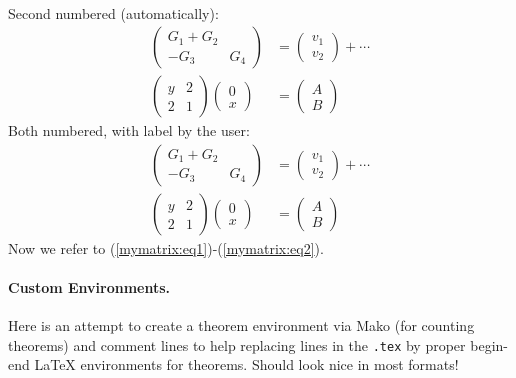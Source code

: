 \documentclass[%
oneside,                 %
final,                   %
10pt]{article}
\theoremstyle{definition}
\begin{document}
\begin{enumerate}
\begin{align}
\nonumber
\end{align}
Second numbered (automatically):
\begin{align}
\begin{pmatrix}
G_1 + G_2\\ 
-G_3 & G_4
\end{pmatrix}
&=
\begin{pmatrix}
 v_1 \\ 
 v_2
\end{pmatrix}
+ \cdots\nonumber
\\ 
\left(\begin{array}{ll}
y & 2\\ 
2 & 1
\end{array}\right)
\left(\begin{array}{ll}
0 \\ x
\end{array}\right)
&= \begin{pmatrix}
A \\ B
\end{pmatrix}
\end{align}
Both numbered, with label by the user:
\begin{align}
\begin{pmatrix}
G_1 + G_2\\ 
-G_3 & G_4
\end{pmatrix}
&=
\begin{pmatrix}
 v_1 \\ 
 v_2
\end{pmatrix}
+ \cdots \label{mymatrix:eq1}
\\ 
\label{mymatrix:eq2}
\left(\begin{array}{ll}
y & 2\\ 
2 & 1
\end{array}\right)
\left(\begin{array}{ll}
0 \\ x
\end{array}\right)
&= \begin{pmatrix}
A \\ B
\end{pmatrix}
\end{align}
Now we refer to (\ref{mymatrix:eq1})-(\ref{mymatrix:eq2}).
\paragraph{Custom Environments.}
Here is an attempt to create a theorem environment via Mako
(for counting theorems) and comment lines to help replacing lines in
the \texttt{.tex} by proper begin-end {\LaTeX} environments for theorems.
Should look nice in most formats!
\label{theorem:fundamental1}

\end{enumerate}
\end{document}

